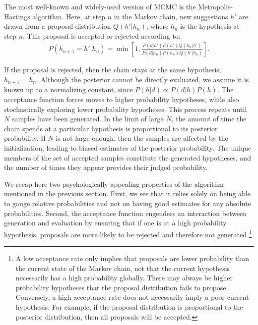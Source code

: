 The most well-known and widely-used version of MCMC is the Metropolis-Hastings algorithm. Here, at step $n$ in the Markov chain, new suggestions $h'$ are drawn from a proposal distribution $Q(h'|h_n)$, where $h_n$ is the hypothesis at step $n$. This proposal is accepted or rejected according to:
\begin{align}
P(h_{n+1}=h'|h_n) = \min\left[1, \frac{P(d|h')P(h') Q(h_n|h')}{P(d|h_n) P(h_n) Q(h'|h_n)} \right].
\end{align}

If the proposal is rejected, then the chain stays at the same hypothesis, $h_{n+1}=h_n$. Although the posterior cannot be directly evaluated, we assume it is known up to a normalizing constant, since $P(h|d) \propto P(d|h) P(h)$. The acceptance function forces moves to higher probability hypotheses, while also stochastically exploring lower probability hypotheses. This process repeats until $N$ samples have been generated. 
In the limit of large $N$, the amount of time the chain spends at a particular hypothesis is proportional to its posterior probability. If $N$ is not large enough, then the samples are affected by the initialization, leading to biased estimates of the posterior probability.
The unique members of the set of accepted samples constitute the generated hypotheses, and the number of times they appear provides their judged probability.

We recap here two psychologically appealing properties of the algorithm mentioned in the previous section. First, we see that it relies solely on being able to gauge relative probabilities and not on having good estimates for any absolute probabilities. Second, the acceptance function engenders an interaction between generation and evaluation by ensuring that if one is at a high probability hypothesis, proposals are more likely to be rejected and therefore not generated%
\footnote{A low acceptance rate only implies that proposals are lower probability than the current state of the Markov chain, not that the current hypothesis necessarily has a high probability globally. There may always be higher probability hypotheses that the proposal distribution fails to propose. Conversely, a high acceptance rate does not necessarily imply a poor current hypothesis. For example, if the proposal distribution is proportional to the posterior distribution, then all proposals will be accepted.}

